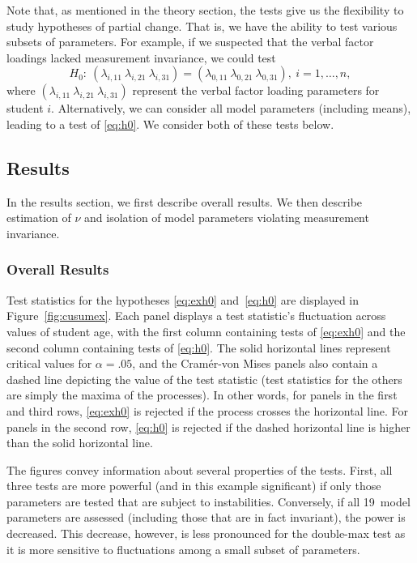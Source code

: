 \documentclass[man]{apa}
\begin{document}
Note that, as mentioned in the theory section, the 
tests give us the flexibility to study hypotheses of partial change.
That is, we have the ability to 
test various subsets of 
parameters.  For example, if we suspected that the verbal factor loadings
lacked measurement invariance, we could test
\begin{equation}
    \label{eq:exh0}
H_0:\ (\lambda_{i,11}\ \lambda_{i,21}\ \lambda_{i,31}) =
(\lambda_{0, 11}\ \lambda_{0, 21}\ \lambda_{0, 31}),\ i=1,\ldots,n,
\end{equation}
where $(\lambda_{i,11}\ \lambda_{i,21}\ \lambda_{i,31})$ represent the
verbal factor loading parameters for student $i$.  Alternatively, we
can consider all model parameters (including means), leading to a test
of \eqref{eq:h0}.  We consider both of these tests below.


\subsection{Results}
In the results section, we first describe overall results.  We then 
describe estimation of $\nu$ and 
isolation of model parameters violating
measurement invariance.

\subsubsection{Overall Results}
Test statistics for the hypotheses \eqref{eq:exh0} and~\eqref{eq:h0}
are displayed in  
Figure~\ref{fig:cusumex}.
Each panel displays a test 
statistic's fluctuation across values of student age, with the first
column containing tests of \eqref{eq:exh0} and the second column
containing tests of \eqref{eq:h0}.  The solid
horizontal 
lines represent critical values for $\alpha=.05$, and
the Cram\'{e}r-von Mises panels 
also contain a dashed line depicting the value of the test
statistic (test statistics for the others are simply 
the maxima of the processes).
In other words, for panels in the first and third rows, \eqref{eq:exh0} is
rejected if the process crosses the horizontal line.  For panels in
the second row, \eqref{eq:h0} is rejected if the dashed horizontal line is
higher than the solid horizontal line.

The figures convey information about several properties
of the tests. First, all three tests are more powerful (and in
this example significant) if only those parameters are tested
that are subject to instabilities. Conversely, if all 19~model
parameters are assessed (including those that are in fact invariant),
the power is decreased. This decrease, however, is less pronounced
for the double-max test as it is more 
sensitive to fluctuations among a small subset of parameters.
\end{document}
